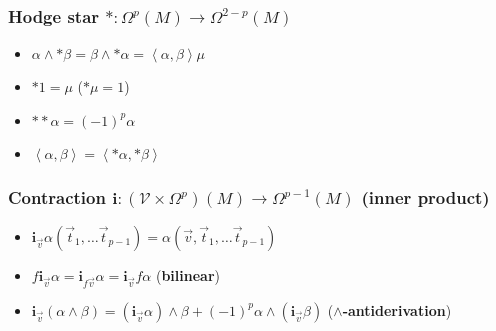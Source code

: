 \documentclass{scrartcl}
\renewcommand{\i}{\mathbf{i}}
\begin{document}
      \subsubsection{Hodge star \( *:\Omega^{p}(M)\rightarrow\Omega^{2-p}(M) \)}
        \begin{itemize}
          \item \( \alpha \wedge *\beta = \beta \wedge *\alpha = \left\langle \alpha,\beta \right\rangle\mu \)
          \item \( *1 = \mu \) \quad(\( *\mu = 1 \))
          \item \( **\alpha = (-1)^{p}\alpha \)
          \item \( \left\langle \alpha, \beta \right\rangle =  \left\langle *\alpha, *\beta \right\rangle\)
        \end{itemize}

      \subsubsection{Contraction \( \i:\left(\mathcal{V}\times\Omega^{p}\right)(M)\rightarrow\Omega^{p-1}(M) \) (inner product)}
        \begin{itemize}
          \item \( \i_{\vec{v}}\alpha\left( \vec{t}_{1},\ldots\vec{t}_{p-1} \right) = \alpha\left(\vec{v}, \vec{t}_{1},\ldots\vec{t}_{p-1} \right) \)
          \item \( f\i_{\vec{v}}\alpha = \i_{f\vec{v}}\alpha 
                                       = \i_{\vec{v}}f\alpha \)
                (\textbf{bilinear})
          \item \( \i_{\vec{v}}\left( \alpha\wedge\beta \right) 
                    = \left( \i_{\vec{v}}\alpha \right)\wedge\beta + (-1)^{p}\alpha\wedge\left( \i_{\vec{v}}\beta \right)\)
                (\textbf{\( \wedge \)-antiderivation})
        \end{itemize}
\end{document}
